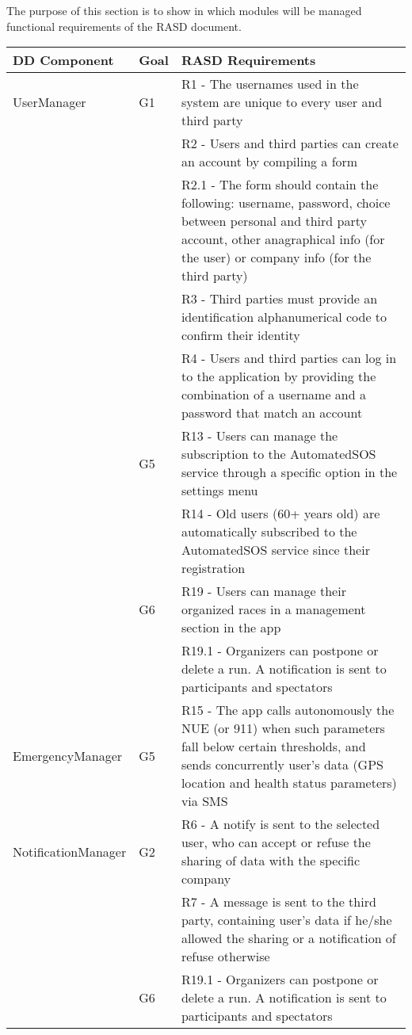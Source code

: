 
%
The purpose of this section is to show in which modules will be managed functional requirements of the RASD document.

\begin{table}[htb]
\begin{adjustbox}{width=\textwidth}
\begin{tabular}{|p{}|p{}|p{}|}
\hline
\textbf{DD Component} & \textbf{Goal} & \textbf{RASD Requirements}\\ \hline
UserManager			& G1	 & R1 - The usernames used in the system are unique to every user and third party	\\[10pt]
					& 		& R2 - Users and third parties can create an account by compiling a form	\\[10pt]
					&		& R2.1 - The form should contain the following: username, password, choice between personal and third party account, other anagraphical info (for the user) or company info (for the third party) \\[10pt]
					&		& R3 - Third parties must provide an identification alphanumerical code to confirm their identity	\\[10pt]
					&		& R4 - Users and third parties can log in to the application by providing the combination of a username and a password that match an account	\\[10pt]
					& G5	 & R13 -	 Users can manage the subscription to the AutomatedSOS service through a specific option in the settings menu \\[10pt]
					&		& R14 -	Old users (60+ years old) are automatically subscribed to the AutomatedSOS service since their registration \\[10pt]
					& G6	 & R19 -	 Users can manage their organized races in a management section in the app \\[10pt]
					&		& R19.1 - Organizers can postpone or delete a run. A notification is sent to participants and spectators \\[10pt] \hline
EmergencyManager	& G5	 & R15 -	 The app calls autonomously the NUE (or 911) when such parameters fall below certain thresholds, and sends concurrently user's data (GPS location and health status parameters) via SMS \\[10pt] \hline
NotificationManager	& G2	 & R6 - A notify is sent to the selected user, who can accept or refuse the sharing of data with the specific company \\[10pt]
					&		& R7 - A message is sent to the third party, containing user's data if he/she allowed the sharing or a notification of refuse otherwise \\[10pt]
					& G6	 & R19.1 - Organizers can postpone or delete a run. A notification is sent to participants and spectators \\[10pt] \hline
\end{tabular}
\end{adjustbox}
\end{table}
			
